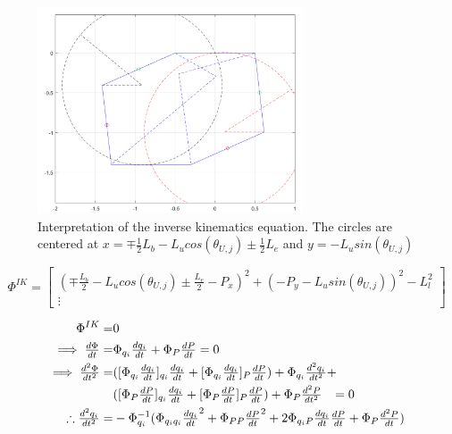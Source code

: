 \begin{figure}[h!]
	\centering
	\includegraphics[width=0.7\textwidth]{figures/Inverse_2D.png}                                                              
	\caption[Interpretation of the inverse kinematics equation]{Interpretation of the inverse kinematics equation. The circles are centered at $x=\mp\tfrac{1}{2}L_b-L_u cos(\theta_{U,j})\pm\tfrac{1}{2}L_e$  and $y=-L_u sin(\theta_{U,j})$}
	\label{fig:inverse2D}
\end{figure}


\begin{equation}
    \Phi^{IK}=
    \begin{bmatrix}
     (\mp \frac{L_b}{2}-L_u cos(\theta_{U,j})\pm\frac{L_e}{2}-P_x)^2+(-P_y-L_u sin(\theta_{U,j}))^2-L_l^2 \\
         \vdots
    \end{bmatrix}
\end{equation}

\begin{align}
\Phi^{IK} =& 0  \nonumber \\
\implies \tfrac{d\Phi}{dt} =&\Phi_{q_i} \tfrac{dq_i}{dt}+\Phi_{P} \tfrac{dP}{dt}  =0\\
\implies 
\tfrac{d^2\Phi}{dt^2} =&([\Phi_{q_i}\tfrac{dq_i}{dt}]_{q_i}\tfrac{dq_i}{dt}+[\Phi_{q_i}\tfrac{dq_i}{dt}]_{P}\tfrac{dP}{dt})+\Phi_{q_i}\tfrac{d^2q_i}{dt^2}+ \nonumber\\
                           &([\Phi_{P}\tfrac{dP}{dt}]_{q_i}\tfrac{dq_i}{dt}+[\Phi_{P}\tfrac{dP}{dt}]_{P}\tfrac{dP}{dt})+\Phi_{P}\tfrac{d^2P}{dt^2}\hphantom{+}=0\\
\therefore  \tfrac{d^2q_i}{dt^2}=&-\Phi_{q_i}^{-1} (\Phi_{q_iq_i}\tfrac{dq_i}{dt}^2+\Phi_{PP}\tfrac{dP}{dt}^2+2\Phi_{q_iP}\tfrac{dq_i}{dt}\tfrac{dP}{dt}+\Phi_P\tfrac{d^2P}{dt}) \label{eq:gammaIK}
\end{align}

